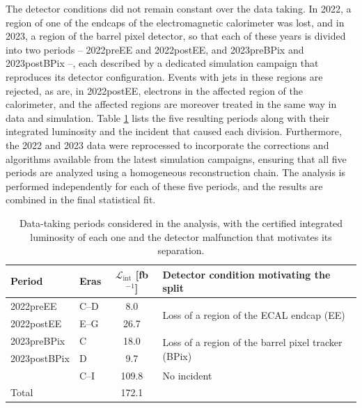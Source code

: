 The detector conditions did not remain constant over the data taking. In 2022, a region of one of the endcaps of the electromagnetic calorimeter was lost, and in 2023, a region of the barrel pixel detector, so that each of these years is divided into two periods -- 2022preEE and 2022postEE, and 2023preBPix and 2023postBPix --, each described by a dedicated simulation campaign that reproduces its detector configuration. Events with jets in these regions are rejected, as are, in 2022postEE, electrons in the affected region of the calorimeter, and the affected regions are moreover treated in the same way in data and simulation. Table \ref{tab:datataking_periods} lists the five resulting periods along with their integrated luminosity and the incident that caused each division. Furthermore, the 2022 and 2023 data were reprocessed to incorporate the corrections and algorithms available from the latest simulation campaigns, ensuring that all five periods are analyzed using a homogeneous reconstruction chain. The analysis is performed independently for each of these five periods, and the results are combined in the final statistical fit.
%
\begin{table}[t]
\centering
\small
\begin{tabular}{llcl}
\toprule
Period & Eras & $\mathcal{L}_{\mathrm{int}}$ [fb$^{-1}$] & Detector condition motivating the split \\
\midrule
2022preEE    & C--D & 8.0   & \multirow{2}{5.2cm}{Loss of a region of the ECAL endcap (EE)} \\
2022postEE   & E--G & 26.7  & \\
\addlinespace
2023preBPix  & C    & 18.0  & \multirow{2}{5.2cm}{Loss of a region of the barrel pixel tracker (BPix)} \\
2023postBPix & D    & 9.7   & \\
\addlinespace
2024         & C--I & 109.8 & No incident \\
\midrule
Total        &      & 172.1 & \\
\bottomrule
\end{tabular}
\caption{Data-taking periods considered in the analysis, with the certified integrated luminosity of each one and the detector malfunction that motivates its separation.}
\label{tab:datataking_periods}
\end{table}




